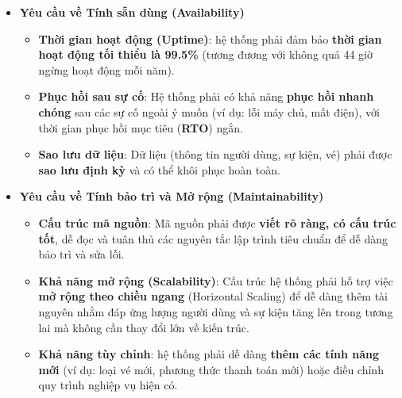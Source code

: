 \begin{itemize}
        \begin{itemize}
            \item[+] \textbf{Giao diện trực quan}: Giao diện người dùng phải \textbf{sạch sẽ, dễ hiểu} và nhất quán trên tất cả các màn hình, giúp người dùng dễ dàng tìm kiếm, chọn và mua vé.
            \item[+] \textbf{Thân thiện với di động}: hệ thống phải \textbf{hoạt động tốt trên các thiết bị di động} (Responsive Design) hoặc được phát triển dưới dạng hệ thống di động chuyên biệt.
            \item[+] \textbf{Thông báo lỗi rõ ràng}: Hệ thống cần cung cấp các thông báo lỗi và cảnh báo \textbf{cụ thể, dễ hiểu} và có tính định hướng để người dùng có thể tự khắc phục hoặc biết cách liên hệ hỗ trợ.
            \item[+] \textbf{Quy trình mua vé đơn giản}: Quy trình mua vé và thanh toán cần được tối ưu hóa để hoàn thành trong \textbf{tối thiểu bước} có thể.
        \end{itemize}
    \item[\textbf{-}] \textbf{Yêu cầu về Tính sẵn dùng (Availability)}
        \begin{itemize}
            \item[+] \textbf{Thời gian hoạt động (Uptime)}: hệ thống phải đảm bảo \textbf{thời gian hoạt động tối thiểu là 99.5\%} (tương đương với không quá 44 giờ ngừng hoạt động mỗi năm).
            \item[+] \textbf{Phục hồi sau sự cố}: Hệ thống phải có khả năng \textbf{phục hồi nhanh chóng} sau các sự cố ngoài ý muốn (ví dụ: lỗi máy chủ, mất điện), với thời gian phục hồi mục tiêu (\textbf{RTO}) ngắn.
            \item[+] \textbf{Sao lưu dữ liệu}: Dữ liệu (thông tin người dùng, sự kiện, vé) phải được \textbf{sao lưu định kỳ} và có thể khôi phục hoàn toàn.
        \end{itemize}
    \item[\textbf{-}] \textbf{Yêu cầu về Tính bảo trì và Mở rộng (Maintainability)}
        \begin{itemize}
            \item[+] \textbf{Cấu trúc mã nguồn}: Mã nguồn phải được \textbf{viết rõ ràng, có cấu trúc tốt}, dễ đọc và tuân thủ các nguyên tắc lập trình tiêu chuẩn để dễ dàng bảo trì và sửa lỗi.
            \item[+] \textbf{Khả năng mở rộng (Scalability)}: Cấu trúc hệ thống phải hỗ trợ việc \textbf{mở rộng theo chiều ngang} (Horizontal Scaling) để dễ dàng thêm tài nguyên nhằm đáp ứng lượng người dùng và sự kiện tăng lên trong tương lai mà không cần thay đổi lớn về kiến trúc.
            \item[+] \textbf{Khả năng tùy chỉnh}: hệ thống phải dễ dàng \textbf{thêm các tính năng mới} (ví dụ: loại vé mới, phương thức thanh toán mới) hoặc điều chỉnh quy trình nghiệp vụ hiện có.
        \end{itemize}
\end{itemize}
